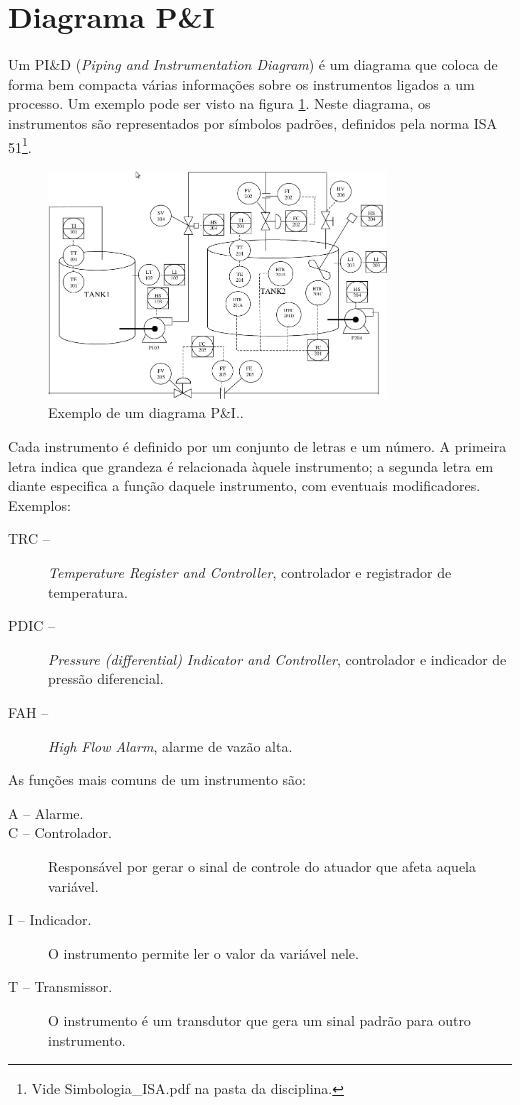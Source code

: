 \section{Diagrama P\&I}

Um PI\&D (\emph{Piping and Instrumentation Diagram}) é um diagrama que coloca de forma bem compacta várias informações sobre os instrumentos ligados a um processo. Um exemplo pode ser visto na figura \ref{fig:exemploPID}. Neste diagrama, os instrumentos são representados por símbolos padrões, definidos pela norma ISA 51\footnote{Vide Simbologia\_ISA.pdf na pasta da disciplina.}.

\begin{figure}[h]
  \centering
  \includegraphics[width = 0.8\textwidth]{figuras/exemploPID}
  \caption{Exemplo de um diagrama P\&I.\label{fig:exemploPID}.}
\end{figure}

Cada instrumento é definido por um conjunto de letras e um número. A primeira letra indica que grandeza é relacionada àquele instrumento; a segunda letra em diante especifica a função daquele instrumento, com eventuais modificadores.
Exemplos:
\begin{description}
  \item[TRC --] \emph{Temperature Register and Controller}, controlador e registrador de temperatura.
  \item[PDIC --] \emph{Pressure (differential) Indicator and Controller}, controlador e indicador de pressão diferencial.
  \item[FAH --] \emph{High Flow Alarm}, alarme de vazão alta.
\end{description}

As funções mais comuns de um instrumento são:
\begin{description}
  \item[A -- Alarme.]
  \item[C -- Controlador.] Responsável por gerar o sinal de controle do atuador que afeta aquela variável.
  \item[I -- Indicador.] O instrumento permite ler o valor da variável nele.
  \item[T -- Transmissor.] O instrumento é um transdutor que gera um sinal padrão para outro instrumento.
\end{description}

